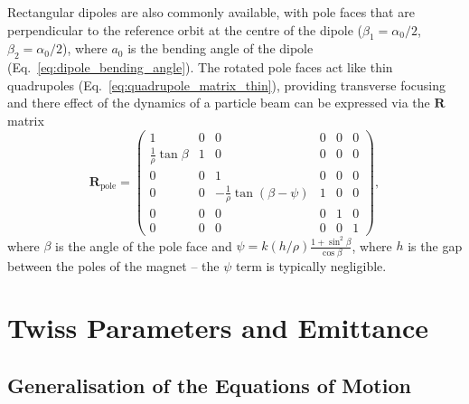\documentclass[../main.tex]{subfiles}
\begin{document}
Rectangular dipoles are also commonly available, with pole faces that are perpendicular to the reference orbit at the centre of the dipole ($\beta_{1}=\alpha_{0}/2$, $\beta_{2}=\alpha_{0}/2$),  where $a_{0}$ is the bending angle of the dipole (Eq.~\ref{eq:dipole_bending_angle}). The rotated pole faces act like thin quadrupoles (Eq.~\ref{eq:quadrupole_matrix_thin}), providing transverse focusing and there effect of the dynamics of a particle beam can be expressed via the $\boldsymbol{R}$ matrix
\begin{equation}
\boldsymbol{R}_{\mathrm{pole}} =
\begin{pmatrix}
1 & 0 & 0 & 0 & 0 & 0 \\
\frac{1}{\rho}\tan\beta & 1 & 0 & 0 & 0 & 0 \\
0 & 0 & 1 & 0 & 0 & 0 \\
0 & 0 & -\frac{1}{\rho}\tan\left(\beta-\psi\right) & 1 & 0 & 0 \\
0 & 0 & 0 & 0 & 1 & 0 \\
0 & 0 & 0 & 0 & 0 & 1
\end{pmatrix},
\label{eq:pole_face_matrix}    
\end{equation}
where $\beta$ is the angle of the pole face and $\psi = k\left(h/\rho\right)\frac{1+\sin^{2}\beta}{\cos\beta}$, where $h$ is the gap between the poles of the magnet -- the $\psi$ term is typically negligible. 

\section{Twiss Parameters and Emittance}
\label{sec:twiss_emittance}

\subsection{Generalisation of the Equations of Motion}
\end{document}
